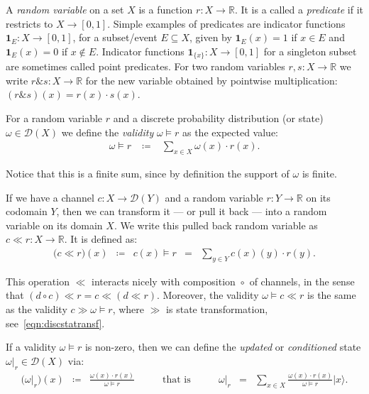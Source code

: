 \documentclass{mscs}
\newcommand{\after}{\mathrel{\circ}}
\newcommand{\Dst}{\mathcal{D}}
\newcommand{\R}{\mathbb{R}}
\newcommand{\bigket}[1]{\ensuremath{\big|#1\big\rangle}}
\newcommand{\andthen}{\ensuremath{\mathrel{\&}}}
\newcommand{\indic}[1]{\mathbf{1}_{#1}}
\begin{document}
A \emph{random variable} on a set $X$ is a function $r\colon X
\rightarrow \R$. It is a called a \emph{predicate} if it restricts to
$X\rightarrow [0,1]$. Simple examples of predicates are indicator
functions $\indic{E} \colon X \rightarrow [0,1]$, for a subset/event
$E\subseteq X$, given by $\indic{E}(x) = 1$ if $x\in E$ and
$\indic{E}(x) = 0$ if $x\not\in E$. Indicator functions $\indic{\{x\}}
\colon X \rightarrow [0,1]$ for a singleton subset are sometimes
called point predicates. For two random variables $r,s\colon X
\rightarrow \R$ we write $r\andthen s\colon X \rightarrow \R$ for the
new variable obtained by pointwise multiplication: $(r\andthen s)(x) =
r(x) \cdot s(x)$.

For a random variable $r$ and a discrete
probability distribution (or state) $\omega\in\Dst(X)$ we define the
\emph{validity} $\omega\models r$ as the expected value:
\begin{equation}
\label{eqn:discvalidity}
\begin{array}{rcl}
\omega\models r
& \;\coloneqq\; &
\displaystyle\sum_{x\in X} \omega(x)\cdot r(x).
\end{array}
\end{equation}

\noindent Notice that this is a finite sum, since by definition the
support of $\omega$ is finite.

If we have a channel $c\colon X \rightarrow \Dst(Y)$ and a random
variable $r\colon Y\rightarrow \R$ on its codomain $Y$, then we can
transform it --- or pull it back --- into a random variable on its
domain $X$. We write this pulled back random variable as $c \ll r
\colon X \rightarrow \R$. It is defined as:
\begin{equation}
\label{eqn:discrandvartransform}
\begin{array}{rcccl}
\big(c \ll r\big)(x)
& \coloneqq &
c(x) \models r
& = &
\displaystyle\sum_{y\in Y} c(x)(y)\cdot r(y).
\end{array}
\end{equation}

\noindent This operation $\ll$ interacts nicely with composition
$\after$ of channels, in the sense that $(d\after c) \ll r = c \ll (d
\ll r)$. Moreover, the validity $\omega \models c \ll r$ is the same
as the validity $c\gg \omega\models r$, where $\gg$ is state
transformation, see~\eqref{eqn:discstatransf}.

If a validity $\omega\models r$ is non-zero, then we can define the
\emph{updated} or \emph{conditioned} state $\omega|_{r} \in \Dst(X)$
via:
\begin{equation}
\label{eqn:discconditioning}
\begin{array}{rclcrcl}
\big(\omega|_{r}\big)(x)
& \coloneqq &
\displaystyle\frac{\omega(x)\cdot r(x)}{\omega\models r}
& \qquad\mbox{that is}\qquad &
\omega|_{r}
& = &
\displaystyle\sum_{x\in X}
   \frac{\omega(x)\cdot r(x)}{\omega\models r}\bigket{x}.
\end{array}
\end{equation}
\end{document}
